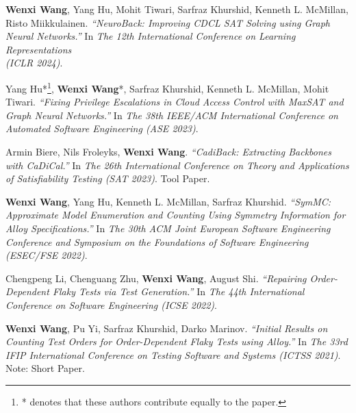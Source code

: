\begin{thebibliography}{99} %
	\textbf{Wenxi Wang}, Yang Hu, Mohit Tiwari, Sarfraz Khurshid, Kenneth L. McMillan, Risto Miikkulainen.
	\emph{``NeuroBack: Improving CDCL SAT Solving using Graph Neural Networks.''}
	In \textit{The 12th International Conference on Learning Representations\\(ICLR 2024)}. \href{https://arxiv.org/pdf/2110.14053.pdf}{\color{color1}{\textbf{[PDF]}}}
	
	
	Yang Hu*\footnote{* denotes that these authors contribute equally to the paper.\label{note1}}, \textbf{Wenxi Wang}*, Sarfraz Khurshid, Kenneth L. McMillan, Mohit Tiwari.
	\emph{``Fixing Privilege Escalations in Cloud Access Control with MaxSAT and Graph Neural Networks.''}
	In \textit{The 38th IEEE/ACM International Conference on Automated Software Engineering (ASE 2023)}. \href{https://wenxiwang.github.io/papers/IAMPERE_ase2023.pdf}{\color{color1}{\textbf{[PDF]}}}
	
	Armin Biere, Nils Froleyks, \textbf{Wenxi Wang}.
	\emph{``CadiBack: Extracting Backbones with CaDiCal.''}
	In \textit{The 26th International Conference on Theory and Applications of Satisfiability Testing (SAT 2023)}.
	Tool Paper. \href{https://wenxiwang.github.io/papers/cadiback.pdf}{\color{color1}{\textbf{[PDF]}}}
	
	\textbf{Wenxi Wang}, Yang Hu, Kenneth L. McMillan, Sarfraz Khurshid.
	\emph{``SymMC: Approximate Model Enumeration and Counting Using Symmetry Information for Alloy Specifications.''}
	In \textit{The 30th ACM Joint European Software Engineering Conference and Symposium on the Foundations of Software Engineering (ESEC/FSE 2022)}. \href{https://wenxiwang.github.io/papers/SymMC.pdf}{\color{color1}{\textbf{[PDF]}}}
	
	Chengpeng Li, Chenguang Zhu, \textbf{Wenxi Wang}, August Shi.
	\emph{``Repairing Order-Dependent Flaky Tests via Test Generation.''}
	In \textit{The 44th International Conference on Software Engineering (ICSE 2022)}. \href{https://wenxiwang.github.io/papers/ICSE2022.pdf}{\color{color1}{\textbf{[PDF]}}}
	
	\textbf{Wenxi Wang}, Pu Yi, Sarfraz Khurshid, Darko Marinov.
	\emph{``Initial Results on Counting Test Orders for Order-Dependent Flaky Tests using Alloy.''}
	In \textit{The 33rd IFIP International Conference on Testing Software and Systems (ICTSS 2021)}.
	Note: Short Paper. \href{https://wenxiwang.github.io/papers/ictss2021.pdf}{\color{color1}{\textbf{[PDF]}}}
	

\end{thebibliography}
